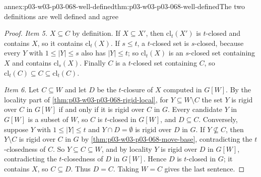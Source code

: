 \begin{annexitem}{annex:p03-w03-p03-068-well-defined}{thm:p03-w03-p03-068-well-defined}{The two definitions are well defined and agree}
\begin{proof}
\emph{Item 5.}  \(X\subseteq C\) by definition.  If \(X\subseteq X'\), then
\(\mathrm{cl}_t(X')\) is \(t\)-closed and contains \(X\), so it contains
\(\mathrm{cl}_t(X)\).  If \(s\leq t\), a \(t\)-closed set is \(s\)-closed,
because every \(Y\) with \(1\leq|Y|\leq s\) also has \(|Y|\leq t\); so
\(\mathrm{cl}_t(X)\) is an \(s\)-closed set containing \(X\) and contains
\(\mathrm{cl}_s(X)\).  Finally \(C\) is a \(t\)-closed set containing \(C\),
so \(\mathrm{cl}_t(C)\subseteq C\subseteq\mathrm{cl}_t(C)\).

\emph{Item 6.}  Let \(C\subseteq W\) and let \(D\) be the \(t\)-closure of
\(X\) computed in \(G[W]\).  By the locality part of
\cref{thm:p03-w03-p03-068-rigid-local}, for \(Y\subseteq W\setminus C\) the
set \(Y\) is rigid over \(C\) in \(G[W]\) if and only if it is rigid over \(C\)
in \(G\).  Every candidate \(Y\) in \(G[W]\) is a subset of \(W\), so \(C\) is
\(t\)-closed in \(G[W]\), and \(D\subseteq C\).  Conversely, suppose \(Y\) with
\(1\leq|Y|\leq t\) and \(Y\cap D=\emptyset\) is rigid over \(D\) in \(G\).  If
\(Y\not\subseteq C\), then \(Y\setminus C\) is rigid over \(C\) in \(G\) by
\cref{thm:p03-w03-p03-068-move-base}, contradicting the \(t\)-closedness of
\(C\).  So \(Y\subseteq C\subseteq W\), and by locality \(Y\) is rigid over
\(D\) in \(G[W]\), contradicting the \(t\)-closedness of \(D\) in \(G[W]\).
Hence \(D\) is \(t\)-closed in \(G\); it contains \(X\), so \(C\subseteq D\).
Thus \(D=C\).  Taking \(W=C\) gives the last sentence.
\end{proof}
\end{annexitem}

